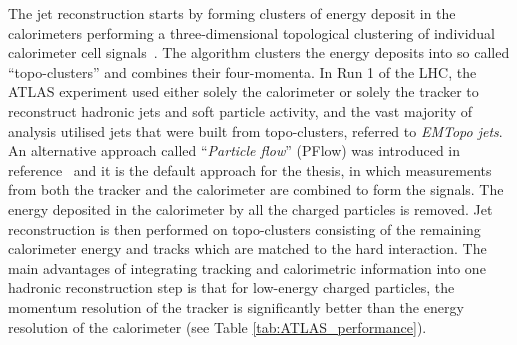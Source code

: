 The jet reconstruction starts by forming clusters of energy deposit
in the calorimeters performing a three-dimensional topological clustering 
of individual calorimeter cell signals~\cite{Aad_2017}.
The algorithm clusters the energy deposits into so called ``topo-clusters'' 
and combines their four-momenta. 
In Run 1 of the LHC, the ATLAS experiment used either
solely the calorimeter or solely the tracker to reconstruct
hadronic jets and soft particle activity, 
and the vast majority of analysis utilised jets that were built 
from topo-clusters, referred to \textit{EMTopo jets}.
An alternative approach called ``\textit{Particle flow}'' (PFlow) was introduced
in reference~\cite{PERF-2015-09} and it is the default approach for the thesis,
in which measurements from both the tracker and the calorimeter 
are combined to form the signals. 
The energy deposited in the calorimeter by all the charged particles is removed.
Jet reconstruction is then performed on topo-clusters
consisting of the remaining calorimeter energy and 
tracks which are matched to the hard interaction.
The main advantages of integrating tracking and calorimetric information 
into one hadronic reconstruction step is that for 
low-energy charged particles, the momentum resolution of the tracker is significantly
better than the energy resolution of the calorimeter (see Table \ref{tab:ATLAS_performance}).

